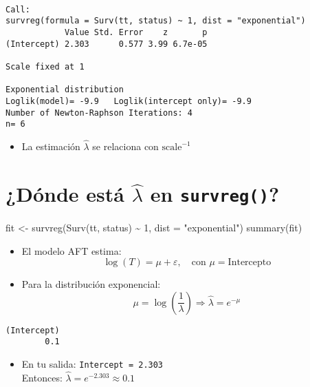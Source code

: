 \documentclass[
]{article}
\newenvironment{Shaded}{\begin{snugshade}}{\end{snugshade}}
\newcommand{\AttributeTok}[1]{\textcolor[rgb]{0.40,0.45,0.13}{#1}}
\newcommand{\DecValTok}[1]{\textcolor[rgb]{0.68,0.00,0.00}{#1}}
\newcommand{\FunctionTok}[1]{\textcolor[rgb]{0.28,0.35,0.67}{#1}}
\newcommand{\NormalTok}[1]{\textcolor[rgb]{0.00,0.23,0.31}{#1}}
\newcommand{\OtherTok}[1]{\textcolor[rgb]{0.00,0.23,0.31}{#1}}
\newcommand{\SpecialCharTok}[1]{\textcolor[rgb]{0.37,0.37,0.37}{#1}}
\newcommand{\StringTok}[1]{\textcolor[rgb]{0.13,0.47,0.30}{#1}}
\providecommand{\tightlist}{%
  \setlength{\itemsep}{0pt}\setlength{\parskip}{0pt}}
\begin{document}
\begin{verbatim}

Call:
survreg(formula = Surv(tt, status) ~ 1, dist = "exponential")
            Value Std. Error    z       p
(Intercept) 2.303      0.577 3.99 6.7e-05

Scale fixed at 1 

Exponential distribution
Loglik(model)= -9.9   Loglik(intercept only)= -9.9
Number of Newton-Raphson Iterations: 4 
n= 6 
\end{verbatim}

\begin{itemize}
\tightlist
\item
  La estimación \(\hat{\lambda}\) se relaciona con \(\text{scale}^{-1}\)
\end{itemize}

\section{\texorpdfstring{¿Dónde está \(\hat{\lambda}\) en
\texttt{survreg()}?}{¿Dónde está \textbackslash hat\{\textbackslash lambda\} en survreg()?}}\label{duxf3nde-estuxe1-hatlambda-en-survreg}

\begin{Shaded}
\begin{Highlighting}[]
\NormalTok{fit }\OtherTok{\textless{}{-}} \FunctionTok{survreg}\NormalTok{(}\FunctionTok{Surv}\NormalTok{(tt, status) }\SpecialCharTok{\textasciitilde{}} \DecValTok{1}\NormalTok{, }\AttributeTok{dist =} \StringTok{"exponential"}\NormalTok{)}
\FunctionTok{summary}\NormalTok{(fit)}
\end{Highlighting}
\end{Shaded}

\begin{itemize}
\item
  El modelo AFT estima: \[
  \log(T) = \mu + \varepsilon, \quad \text{con } \mu = \text{Intercepto}
  \]
\item
  Para la distribución exponencial: \[
  \mu = \log\left(\frac{1}{\lambda}\right) \Rightarrow
  \hat{\lambda} = e^{-\mu}
  \]
\end{itemize}

\begin{verbatim}
(Intercept) 
        0.1 
\end{verbatim}

\begin{itemize}
\tightlist
\item
  En tu salida: \texttt{Intercept\ =\ 2.303}\\
  Entonces: \(\hat{\lambda} = e^{-2.303} \approx 0.1\)
\end{itemize}
\end{document}
